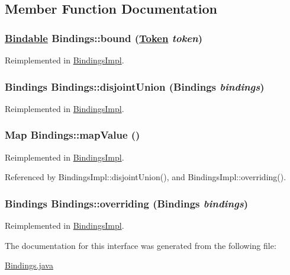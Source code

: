 \subsection{Member Function Documentation}
\hypertarget{interfaceBindings_a1}{
\subsubsection[bound]{\setlength{\rightskip}{0pt plus 5cm}\hyperlink{interfaceBindable}{Bindable} Bindings::bound (\hyperlink{interfaceToken}{Token} {\em token})}}
\label{interfaceBindings_a1}




Reimplemented in \hyperlink{classBindingsImpl_a1}{Bindings\-Impl}.\hypertarget{interfaceBindings_a3}{
\subsubsection[disjointUnion]{\setlength{\rightskip}{0pt plus 5cm}Bindings Bindings::disjoint\-Union (Bindings {\em bindings})}}
\label{interfaceBindings_a3}




Reimplemented in \hyperlink{classBindingsImpl_a3}{Bindings\-Impl}.\hypertarget{interfaceBindings_a0}{
\subsubsection[mapValue]{\setlength{\rightskip}{0pt plus 5cm}Map Bindings::map\-Value ()}}
\label{interfaceBindings_a0}




Reimplemented in \hyperlink{classBindingsImpl_a0}{Bindings\-Impl}.

Referenced by Bindings\-Impl::disjoint\-Union(), and Bindings\-Impl::overriding().

\hypertarget{interfaceBindings_a2}{
\subsubsection[overriding]{\setlength{\rightskip}{0pt plus 5cm}Bindings Bindings::overriding (Bindings {\em bindings})}}
\label{interfaceBindings_a2}




Reimplemented in \hyperlink{classBindingsImpl_a2}{Bindings\-Impl}.

The documentation for this interface was generated from the following file:\begin{CompactItemize}
\item 
\hyperlink{Bindings_8java-source}{Bindings.java}\end{CompactItemize}
